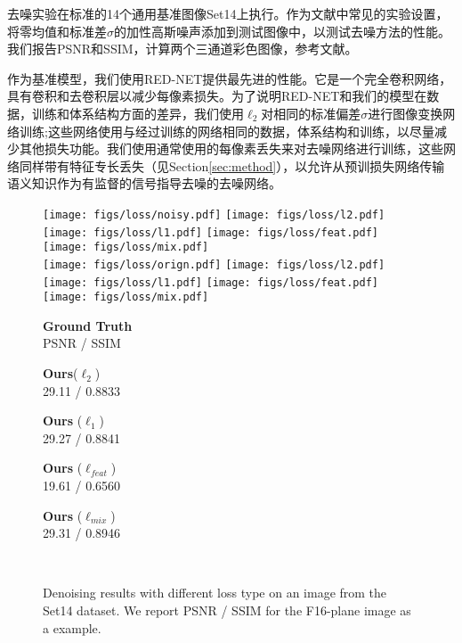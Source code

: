 去噪实验在标准的14个通用基准图像Set14上执行。作为文献中常见的实验设置，将零均值和标准差$ \sigma $的加性高斯噪声添加到测试图像中，以测试去噪方法的性能。我们报告PSNR和SSIM\cite{Wang2004}，计算两个三通道彩色图像，参考文献\citep{Mao2016,Zhao2015}。

作为基准模型，我们使用RED-NET\cite{Mao2016}提供最先进的性能。它是一个完全卷积网络，具有卷积和去卷积层以减少每像素损失。为了说明RED-NET和我们的模型在数据，训练和体系结构方面的差异，我们使用$ \ell_{2} $对相同的标准偏差$ \sigma $进行图像变换网络训练;这些网络使用与经过训练的网络相同的数据，体系结构和训练，以尽量减少其他损失功能。我们使用通常使用的每像素丢失来对去噪网络进行训练，这些网络同样带有特征专长丢失（见Section\ref{sec:method}），以允许从预训损失网络传输语义知识作为有监督的信号指导去噪的去噪网络。

\begin{figure}[t]
\centering
  \texttt{[image: figs/loss/noisy.pdf]}
  \texttt{[image: figs/loss/l2.pdf]}
  \texttt{[image: figs/loss/l1.pdf]}
  \texttt{[image: figs/loss/feat.pdf]}
  \texttt{[image: figs/loss/mix.pdf]}  \\{}
  \texttt{[image: figs/loss/orign.pdf]}
  \texttt{[image: figs/loss/l2.pdf]}
  \texttt{[image: figs/loss/l1.pdf]}
  \texttt{[image: figs/loss/feat.pdf]}
  \texttt{[image: figs/loss/mix.pdf]} \\
   \begin{minipage}{0.19\textwidth}
        \centering \textbf{Ground Truth} \\ PSNR / SSIM
   \end{minipage}
   \begin{minipage}{0.19\textwidth}
     \centering \textbf{Ours}($\ell_{2}$) \\ 29.11 / 0.8833
   \end{minipage}
   \begin{minipage}{0.19\textwidth}
     \centering \textbf{Ours} ($\ell_{1}$) \\ 29.27 / 0.8841
   \end{minipage}
   \begin{minipage}{0.19\textwidth}
     \centering \textbf{Ours} ($\ell_{feat}$) \\  19.61 / 0.6560
   \end{minipage}
   \begin{minipage}{0.19\textwidth}
     \centering \textbf{Ours} ($\ell_{mix}$) \\  29.31 / 0.8946
   \end{minipage} \\
  \caption{Denoising results with different loss type on an image from the
    Set14 dataset. We report PSNR / SSIM for the  F16-plane image as a example. 
  }
  \vspace{-4mm}
  \label{fig:l1-l2-feat-results}
\end{figure}
